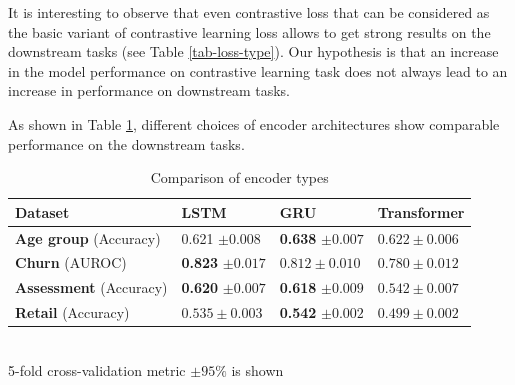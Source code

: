 \documentclass{article}
\begin{document}
It is interesting to observe that even contrastive loss that can be considered as the basic variant of contrastive learning loss allows to get strong results on the downstream tasks (see Table \ref{tab-loss-type}). Our hypothesis is that an increase in the model performance on contrastive learning task does not always lead to an increase in performance on downstream tasks.

As shown in Table \ref{tab-enc-type}, different choices of encoder architectures show comparable performance on the downstream tasks.

\begin{table}
\centering
\caption{Comparison of encoder types}
\begin{tabular}{llll}
\toprule
\textbf{Dataset} & \textbf{LSTM} & \textbf{GRU} & \textbf{Transformer} \\
\midrule
\textbf{Age group} \small{(Accuracy)} & 0.621 $\pm 0.008$ & \textbf{0.638} $\pm 0.007$ & $0.622 \pm 0.006$ \\
\textbf{Churn} \small{(AUROC)} & \textbf{0.823} $\pm 0.017$ & $0.812 \pm 0.010$ & $0.780 \pm 0.012$  \\
\textbf{Assessment} \small{(Accuracy)} & \textbf{0.620} $\pm 0.007$ & \textbf{0.618} $\pm 0.009$ & $0.542 \pm 0.007$  \\
\textbf{Retail} \small{(Accuracy)} & $0.535 \pm 0.003$ & \textbf{0.542} $\pm 0.002$ & $0.499 \pm 0.002$  \\
\bottomrule
\end{tabular} \\
\small{5-fold cross-validation metric $\pm 95\%$ is shown}
\label{tab-enc-type}
\end{table}
\end{document}
